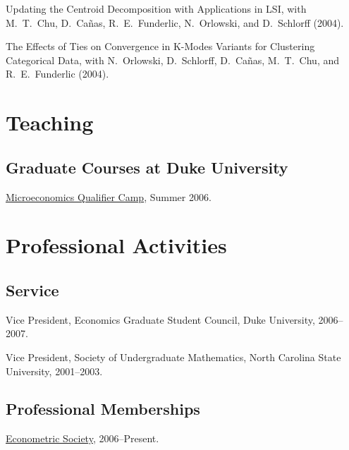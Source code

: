 \documentclass[letterpaper]{article}
\renewenvironment{itemize}{
  \begin{list}{}{
    \setlength{\leftmargin}{1em}
  }
}{
  \end{list}
}
\begin{document}
\begin{itemize}
\item Updating the Centroid Decomposition with Applications in LSI,
  with M.\ T.\ Chu, D.\ Ca\~{n}as, R.\ E.\ Funderlic, N.\ Orlowski, and
  D.\ Schlorff (2004).

\item The Effects of Ties on Convergence in K-Modes Variants for
  Clustering Categorical Data, with N.\ Orlowski, D.\ Schlorff, D.\
  Ca\~{n}as, M.\ T.\ Chu, and R.\ E.\ Funderlic (2004).
\end{itemize}


\section*{Teaching}

\subsection*{Graduate Courses at Duke University}

\begin{itemize}
\item \href{http://jblevins.org/courses/qualcamp06}{Microeconomics
    Qualifier Camp}, Summer 2006.
\end{itemize}


\section*{Professional Activities}

\subsection*{Service}

\begin{itemize}
\item Vice President, Economics Graduate Student Council, Duke University,
  2006--2007.
\item Vice President, Society of Undergraduate Mathematics, North
  Carolina State University, 2001--2003.
\end{itemize}

\subsection*{Professional Memberships}

\begin{itemize}
\item \href{http://www.econometricsociety.org/}{Econometric Society},
  2006--Present.
\end{itemize}
\end{document}
